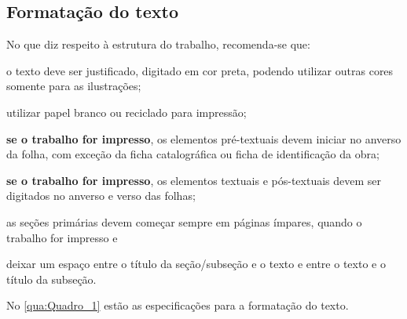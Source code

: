 \subsection{Formatação do texto}

No que diz respeito à estrutura do trabalho, recomenda-se que:
\begin{alineas}
	\item o texto deve ser justificado, digitado em cor preta, podendo utilizar outras cores somente para as ilustrações;
	\item utilizar papel branco ou reciclado para impressão;
	\item \textbf{se o trabalho for impresso}, os elementos pré-textuais devem iniciar no anverso da folha, com exceção da ficha catalográfica ou ficha de identificação da obra;
	\item \textbf{se o trabalho for impresso}, os elementos textuais e pós-textuais devem ser digitados no anverso e verso das folhas;
	\item as seções primárias devem começar sempre em páginas ímpares, quando o trabalho for impresso e
	\item deixar um espaço entre o título da seção/subseção e o texto e entre o texto e o título da subseção.
\end{alineas}

No \autoref{qua:Quadro_1} estão as especificações para a formatação do texto.

